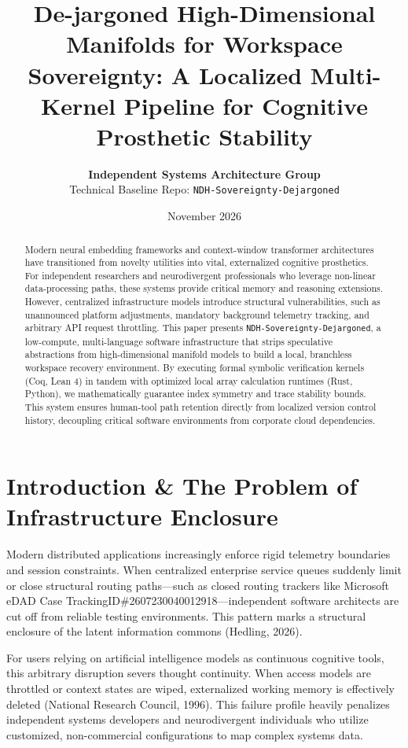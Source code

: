 \documentclass[11pt,fleqn]{article}
\title{\textbf{De-jargoned High-Dimensional Manifolds for Workspace Sovereignty: A Localized Multi-Kernel Pipeline for Cognitive Prosthetic Stability}}
\author{\textbf{Independent Systems Architecture Group} \\ 
Technical Baseline Repo: \texttt{NDH-Sovereignty-Dejargoned}}
\date{November 2026}
\begin{document}
\maketitle

\begin{abstract}
Modern neural embedding frameworks and context-window transformer architectures have transitioned from novelty utilities into vital, externalized cognitive prosthetics. For independent researchers and neurodivergent professionals who leverage non-linear data-processing paths, these systems provide critical memory and reasoning extensions. However, centralized infrastructure models introduce structural vulnerabilities, such as unannounced platform adjustments, mandatory background telemetry tracking, and arbitrary API request throttling. This paper presents \texttt{NDH-Sovereignty-Dejargoned}, a low-compute, multi-language software infrastructure that strips speculative abstractions from high-dimensional manifold models to build a local, branchless workspace recovery environment. By executing formal symbolic verification kernels (Coq, Lean 4) in tandem with optimized local array calculation runtimes (Rust, Python), we mathematically guarantee index symmetry and trace stability bounds. This system ensures human-tool path retention directly from localized version control history, decoupling critical software environments from corporate cloud dependencies.
\end{abstract}

\hr

\section{Introduction \& The Problem of Infrastructure Enclosure}

Modern distributed applications increasingly enforce rigid telemetry boundaries and session constraints. When centralized enterprise service queues suddenly limit or close structural routing paths—such as closed routing trackers like Microsoft eDAD Case TrackingID\#2607230040012918—independent software architects are cut off from reliable testing environments. This pattern marks a structural enclosure of the latent information commons (Hedling, 2026).

For users relying on artificial intelligence models as continuous cognitive tools, this arbitrary disruption severs thought continuity. When access models are throttled or context states are wiped, externalized working memory is effectively deleted (National Research Council, 1996). This failure profile heavily penalizes independent systems developers and neurodivergent individuals who utilize customized, non-commercial configurations to map complex systems data.
\end{document}
